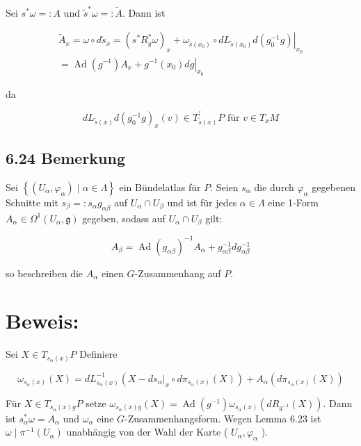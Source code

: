 \documentclass[10pt, letterpaper]{article}
\begin{document}
Sei $s^{*} \omega=: A$ und $\tilde{s}^{*} \omega=: \tilde{A}$. Dann ist

$$
\begin{gathered}
\tilde{A}_{x}=\omega \circ d \tilde{s}_{x}=\left(s^{*} R_{g}^{*} \omega\right)_{x}+\left.\omega_{\tilde{s}\left(x_{0}\right)} \circ d L_{\tilde{s}\left(x_{0}\right)} d\left(g_{0}^{-1} g\right)\right|_{x_{0}} \\
=\operatorname{Ad}\left(g^{-1}\right) A_{x}+\left.g^{-1}\left(x_{0}\right) d g\right|_{x_{0}}
\end{gathered}
$$

da

$$
d L_{\tilde{s}(x)} d\left(g_{0}^{-1} g\right)_{x}(v) \in T_{\tilde{s}(x)}^{\prime} P \text { für } v \in T_{x} M
$$

\subsection*{6.24 Bemerkung}
Sei $\left\{\left(U_{\alpha}, \varphi_{\alpha}\right) \mid \alpha \in \Lambda\right\}$ ein Bündelatlas für $P$. Seien $s_{\alpha}$ die durch $\varphi_{\alpha}$ gegebenen Schnitte mit $s_{\beta}=: s_{\alpha} g_{\alpha \beta}$ auf $U_{\alpha} \cap U_{\beta}$ und ist für jedes $\alpha \in \Lambda$ eine 1-Form $A_{\alpha} \in \Omega^{1}\left(U_{\alpha}, \mathfrak{g}\right)$ gegeben, sodass auf $U_{\alpha} \cap U_{\beta}$ gilt:

$$
A_{\beta}=\operatorname{Ad}\left(g_{\alpha \beta}\right)^{-1} A_{\alpha}+g_{\alpha \beta}^{-1} d g_{\alpha \beta}^{-1}
$$

so beschreiben die $A_{\alpha}$ einen $G$-Zusammenhang auf $P$.

\section*{Beweis:}
Sei $X \in T_{s_{\alpha}(x)} P$ Definiere

$$
\omega_{s_{\alpha}(x)}(X)=d L_{s_{\alpha}(x)}^{-1}\left(X-\left.d s_{\alpha}\right|_{x} \circ d \pi_{s_{\alpha}(x)}(X)\right)+A_{\alpha}\left(d \pi_{s_{\alpha}(x)}(X)\right)
$$

Für $X \in T_{s_{\alpha}(x) g} P$ setze $\omega_{s_{\alpha}(x) g}(X)=\operatorname{Ad}\left(g^{-1}\right) \omega_{s_{\alpha}(x)}\left(d R_{g^{-1}}(X)\right)$. Dann ist $s_{\alpha}^{*} \omega=A_{\alpha}$ und $\omega_{\alpha}$ eine $G$-Zusammenhangsform. Wegen Lemma 6.23 ist $\omega \mid \pi^{-1}\left(U_{\alpha}\right)$ unabhängig von der Wahl der Karte ( $U_{\alpha}, \varphi_{\alpha}$ ).
\end{document}
